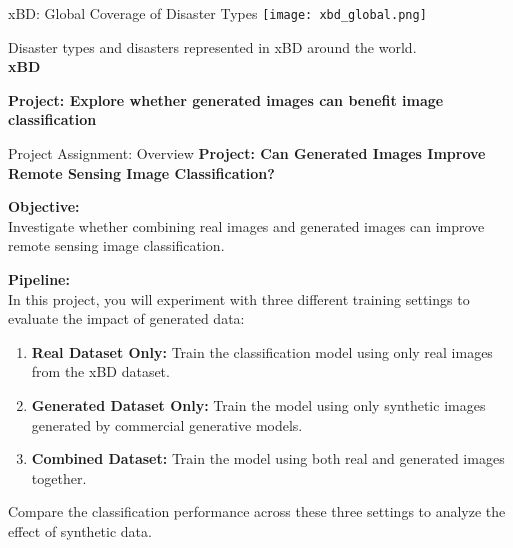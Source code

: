 \begin{refsection}
  \begin{frame}{xBD: Global Coverage of Disaster Types}
    \centering
    \texttt{[image: xbd\_global.png]}
    
    \vspace{0.5em}
    \scriptsize
    Disaster types and disasters represented in xBD around the world.\\
    \textbf{xBD}~\parencite{guptaCreatingXBDDataset2019}
    \bottomleftrefs
  \end{frame}
\end{refsection}

\begin{refsection}
  \begin{frame}
    \centering
    \vspace{2.5cm}
    {\LARGE \textbf{Project: Explore whether generated images can benefit image classification}}
  \end{frame}
\end{refsection}

\begin{refsection}
  \begin{frame}{Project Assignment: Overview}
    \textbf{Project: Can Generated Images Improve Remote Sensing Image Classification?}
  
    \vspace{0.7em}
    \textbf{Objective:}\\
    Investigate whether combining real images and generated images can improve remote sensing image classification.

    \vspace{1em}
    \textbf{Pipeline:}\\
    In this project, you will experiment with three different training settings to evaluate the impact of generated data:
    \begin{enumerate}
      \item \textbf{Real Dataset Only:} Train the classification model using only real images from the xBD dataset.
      \item \textbf{Generated Dataset Only:} Train the model using only synthetic images generated by commercial generative models.
      \item \textbf{Combined Dataset:} Train the model using both real and generated images together.
    \end{enumerate}
    Compare the classification performance across these three settings to analyze the effect of synthetic data.

    \bottomleftrefs
  \end{frame}
\end{refsection}
  
